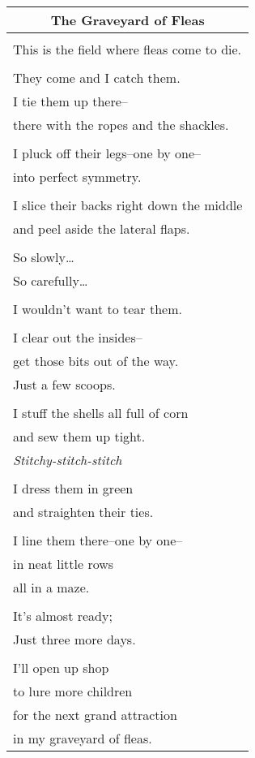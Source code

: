 \documentclass{article}
\begin{document}
\begin{center}
\begin{tabular}{l}
\multicolumn{1}{c}{\textbf{The Graveyard of Fleas}} \\ \hline
\\
This is the field where fleas come to die. \\
\\
They come and I catch them. \\
I tie them up there-- \\
there with the ropes and the shackles. \\
\\
I pluck off their legs--one by one-- \\
into perfect symmetry. \\
\\
I slice their backs right down the middle \\
and peel aside the lateral flaps. \\
\\
So slowly\ldots{} \\
So carefully\ldots{} \\
\\
I wouldn't want to tear them. \\
\\
I clear out the insides-- \\
get those bits out of the way. \\
Just a few scoops. \\
\\
I stuff the shells all full of corn \\
and sew them up tight. \\
\textit{Stitchy-stitch-stitch} \\
\\
I dress them in green \\
and straighten their ties. \\
\\
I line them there--one by one-- \\
in neat little rows \\
all in a maze. \\
\\
It's almost ready; \\
Just three more days. \\
\\
I'll open up shop \\
to lure more children \\ %
for the next grand attraction \\ %
in my graveyard of fleas. \\
\end{tabular}
\end{center}
\end{document}

